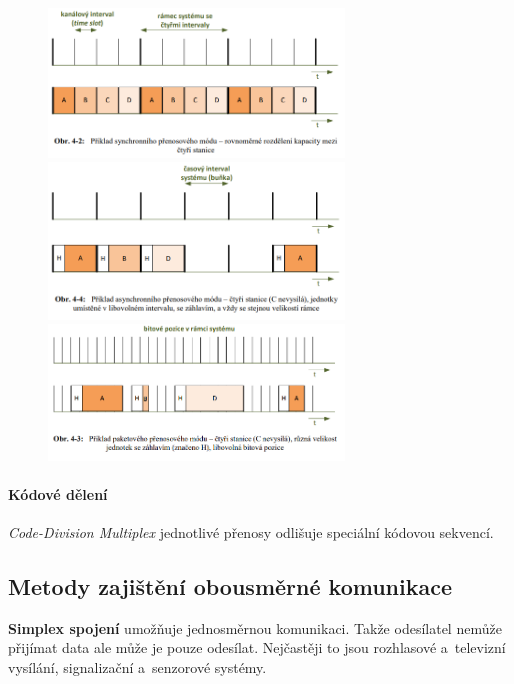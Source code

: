 \begin{figure}[ht]
	\centering
	\includegraphics[width=0.7\textwidth]{images/q04_time_synchronous}
	\includegraphics[width=0.7\textwidth]{images/q04_time_asynchronous}
	\includegraphics[width=0.7\textwidth]{images/q04_time_packet}
\end{figure}

\paragraph{Kódové dělení} \emph{Code-Division Multiplex} jednotlivé přenosy odlišuje speciální kódovou sekvencí.

\subsection{Metody zajištění obousměrné komunikace}
\label{q07}

\textbf{Simplex spojení} umožňuje jednosměrnou komunikaci. Takže odesílatel nemůže přijímat data ale může je pouze odesílat. Nejčastěji to jsou rozhlasové a~televizní vysílání, signalizační a~senzorové systémy.

